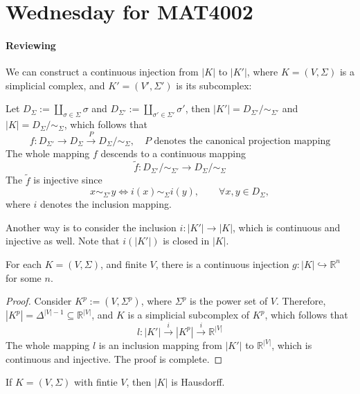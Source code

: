 \section{Wednesday for MAT4002}
\paragraph{Reviewing}
We can construct a continuous injection from $|K|$ to $|K'|$, where $K=(V,\Sigma)$ is a simplicial complex, and $K'=(V',\Sigma')$ is its subcomplex:

Let $D_{\Sigma}:=\coprod_{\sigma\in\Sigma}\sigma$ and $D_{\Sigma'}:=\coprod_{\sigma'\in\Sigma'}\sigma'$, then
$|K'| = D_{\Sigma'}/\sim_{\Sigma'}$ and $|K| = D_{\Sigma}/\sim_{\Sigma}$, which follows that
\[
f:D_{\Sigma'}\to D_{\Sigma}\xrightarrow{P}D_{\Sigma}/\sim_{\Sigma},\quad\text{$P$ denotes the canonical projection mapping}
\]
The whole mapping $f$ descends to a continuous mapping
\[
\tilde{f}:D_{\Sigma'}/\sim_{\Sigma'}\to D_{\Sigma}/\sim_{\Sigma}
\]
The $\tilde{f}$ is injective since
\begin{equation}\label{Eq:8:2}
x\sim_{\Sigma'}y\Longleftrightarrow
i(x)\sim_{\Sigma}i(y),\qquad
\forall x,y\in D_{\Sigma},
\end{equation}
where $i$ denotes the inclusion mapping.

Another way is to consider the inclusion $i:|K'|\to |K|$, which is continuous and injective as well.
Note that $i(|K'|)$ is closed in $|K|$.

\begin{proposition}
For each $K=(V,\Sigma)$, and finite $V$, 
there is a continuous injection 
$g:|K|\hookrightarrow\mathbb{R}^n$ for some $n$.
\end{proposition}

\begin{proof}
Consider $K^p:=(V,\Sigma^p)$, where $\Sigma^p$ is the power set of $V$.
Therefore, $|K^p| = \Delta^{|V|-1}\subseteq\mathbb{R}^{|V|}$, and $K$ is a simplicial subcomplex of $K^p$, which follows that
\[
l:|K'|\xrightarrow{i}|K^p|\xrightarrow{i}\mathbb{R}^{|V|}
\]
The whole mapping $l$ is an inclusion mapping from $|K'|$ to $\mathbb{R}^{|V|}$, which is continuous and injective. The proof is complete.
\end{proof}

\begin{proposition}[Hausdorff]
If $K=(V,\Sigma)$ with fintie $V$, then $|K|$ is Hausdorff.
\end{proposition}

